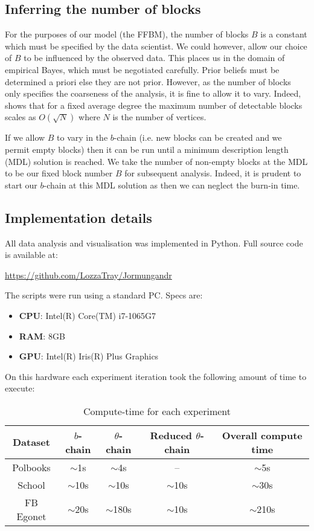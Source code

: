 \FloatBarrier

\subsection{Inferring the number of blocks}

For the purposes of our model (the FFBM), the number of blocks $B$ is a constant which must be specified by the data scientist. We could however, allow our choice of $B$ to be influenced by the observed data. This places us in the domain of empirical Bayes, which must be negotiated carefully. Prior beliefs must be determined a priori else they are not prior. However, as the number of blocks only specifies the coarseness of the analysis, it is fine to allow it to vary. Indeed, \citet{peixoto-determine-B} shows that for a fixed average degree the maximum number of detectable blocks scales as $O(\sqrt{N})$ where $N$ is the number of vertices.

If we allow $B$ to vary in the $b$-chain (i.e. new blocks can be created and we permit empty blocks) then it can be run  until a minimum description length (MDL) solution is reached. We take the number of non-empty blocks at the MDL to be our fixed block number $B$ for subsequent analysis. Indeed, it is prudent to start our $b$-chain at this MDL solution as then we can neglect the burn-in time.

\subsection{Implementation details}
\label{appdx:imp-details}

All data analysis and visualisation was implemented in Python. Full source code is available at:

\url{https://github.com/LozzaTray/Jormungandr}

The scripts were run using a standard PC. Specs are:

\begin{itemize}
	\item \textbf{CPU}: Intel(R) Core(TM) i7-1065G7
	\item \textbf{RAM}: 8GB
	\item \textbf{GPU}: Intel(R) Iris(R) Plus Graphics
\end{itemize}

On this hardware each experiment iteration took the following amount of time to execute:

\begin{table}[!h]
	\centering
	\caption{Compute-time for each experiment}
	\label{tab:compute-time}
	\begin{tabular}{c|ccc|c}
		Dataset & $b$-chain & $\theta$-chain & Reduced $\theta$-chain & Overall compute time \\ \hline
		Polbooks & $\sim$1s & $\sim$4s & -- & $\sim$5s \\
		School & $\sim$10s & $\sim$10s & $\sim$10s & $\sim$30s \\
		FB Egonet & $\sim$20s & $\sim$180s & $\sim$10s & $\sim$210s
	\end{tabular}
\end{table}

